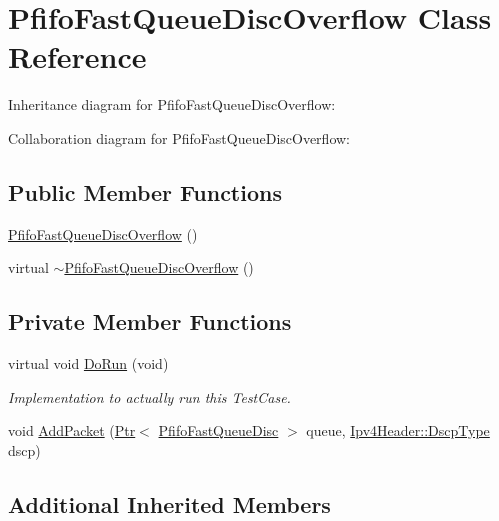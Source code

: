\hypertarget{classPfifoFastQueueDiscOverflow}{}\section{Pfifo\+Fast\+Queue\+Disc\+Overflow Class Reference}
\label{classPfifoFastQueueDiscOverflow}


Inheritance diagram for Pfifo\+Fast\+Queue\+Disc\+Overflow\+:


Collaboration diagram for Pfifo\+Fast\+Queue\+Disc\+Overflow\+:
\subsection*{Public Member Functions}
\begin{DoxyCompactItemize}
\item 
\hyperlink{classPfifoFastQueueDiscOverflow_a196b87ee3624f1908f279dd4470669a7}{Pfifo\+Fast\+Queue\+Disc\+Overflow} ()
\item 
virtual \hyperlink{classPfifoFastQueueDiscOverflow_a0bb366677eb07212f9aea00d5d1bc4e6}{$\sim$\+Pfifo\+Fast\+Queue\+Disc\+Overflow} ()
\end{DoxyCompactItemize}
\subsection*{Private Member Functions}
\begin{DoxyCompactItemize}
\item 
virtual void \hyperlink{classPfifoFastQueueDiscOverflow_a4a57537e8abbdc4fabf914a603b31163}{Do\+Run} (void)
\begin{DoxyCompactList}\small\item\em Implementation to actually run this Test\+Case. \end{DoxyCompactList}\item 
void \hyperlink{classPfifoFastQueueDiscOverflow_a582831d7aed3c5d5f57d3bd4859a7f89}{Add\+Packet} (\hyperlink{classns3_1_1Ptr}{Ptr}$<$ \hyperlink{classns3_1_1PfifoFastQueueDisc}{Pfifo\+Fast\+Queue\+Disc} $>$ queue, \hyperlink{classns3_1_1Ipv4Header_aaa17802e7732a689311b72d48d1a3450}{Ipv4\+Header\+::\+Dscp\+Type} dscp)
\end{DoxyCompactItemize}
\subsection*{Additional Inherited Members}


